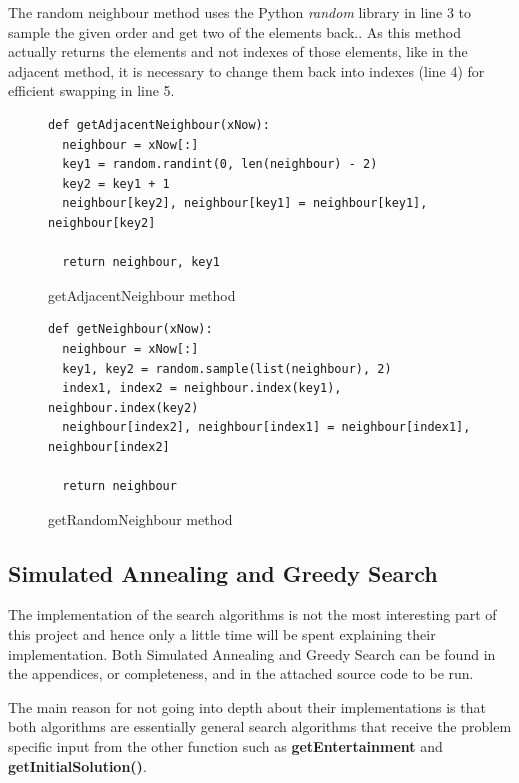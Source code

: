 \documentclass[12pt]{report}
\begin{document}
The random neighbour method uses the Python \textit{random} library in line 3 to sample the given order and get two of the elements back.\cite{PythonSample}. As this method actually returns the elements and not indexes of those elements, like in the adjacent method, it is necessary to change them back into indexes (line 4) for efficient swapping in line 5.

\begin{figure}[H]
\caption{getAdjacentNeighbour method}
\label{adjacentNeighbour}
\begin{lstlisting}
def getAdjacentNeighbour(xNow):
  neighbour = xNow[:]
  key1 = random.randint(0, len(neighbour) - 2)
  key2 = key1 + 1
  neighbour[key2], neighbour[key1] = neighbour[key1], neighbour[key2]
    
  return neighbour, key1
\end{lstlisting}
\end{figure}

\begin{figure}[H]
\caption{getRandomNeighbour method}
\label{randomNeighbour}
\begin{lstlisting}
def getNeighbour(xNow):
  neighbour = xNow[:]
  key1, key2 = random.sample(list(neighbour), 2)
  index1, index2 = neighbour.index(key1), neighbour.index(key2)
  neighbour[index2], neighbour[index1] = neighbour[index1], neighbour[index2]
    
  return neighbour
\end{lstlisting}
\end{figure}

\subsection{Simulated Annealing and Greedy Search}\label{Imp-searchAlgos}
The implementation of the search algorithms is not the most interesting part of this project and hence only a little time will be spent explaining their implementation. Both Simulated Annealing and Greedy Search can be found in the appendices, or completeness, and in the attached source code to be run.

The main reason for not going into depth about their implementations is that both algorithms are essentially general search algorithms that receive the problem specific input from the other function such as \textbf{getEntertainment} and \textbf{getInitialSolution()}.
\end{document}

